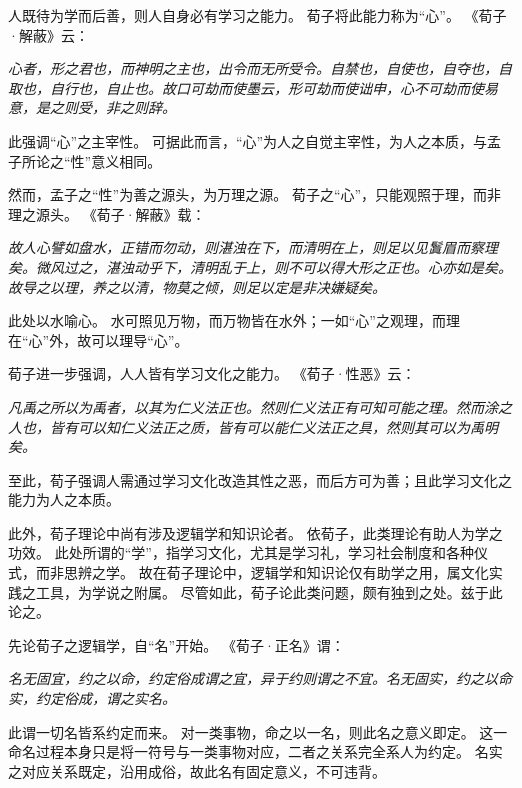 \documentclass[11pt]{article}
\begin{document}
\newline

人既待为学而后善，则人自身必有学习之能力。
荀子将此能力称为“心”。
《荀子·解蔽》云：

\textit{心者，形之君也，而神明之主也，出令而无所受令。自禁也，自使也，自夺也，自取也，自行也，自止也。故口可劫而使墨云，形可劫而使诎申，心不可劫而使易意，是之则受，非之则辞。}

此强调“心”之主宰性。
可据此而言，“心”为人之自觉主宰性，为人之本质，与孟子所论之“性”意义相同。

\newline

然而，孟子之“性”为善之源头，为万理之源。
荀子之“心”，只能观照于理，而非理之源头。
《荀子·解蔽》载：

\textit{故人心譬如盘水，正错而勿动，则湛浊在下，而清明在上，则足以见鬒眉而察理矣。微风过之，湛浊动乎下，清明乱于上，则不可以得大形之正也。心亦如是矣。故导之以理，养之以清，物莫之倾，则足以定是非决嫌疑矣。}

此处以水喻心。
水可照见万物，而万物皆在水外；一如“心”之观理，而理在“心”外，故可以理导“心”。

\newline

荀子进一步强调，人人皆有学习文化之能力。
《荀子·性恶》云：

\textit{凡禹之所以为禹者，以其为仁义法正也。然则仁义法正有可知可能之理。然而涂之人也，皆有可以知仁义法正之质，皆有可以能仁义法正之具，然则其可以为禹明矣。}

至此，荀子强调人需通过学习文化改造其性之恶，而后方可为善；且此学习文化之能力为人之本质。

\newline

此外，荀子理论中尚有涉及逻辑学和知识论者。
依荀子，此类理论有助人为学之功效。
此处所谓的“学”，指学习文化，尤其是学习礼，学习社会制度和各种仪式，而非思辨之学。
故在荀子理论中，逻辑学和知识论仅有助学之用，属文化实践之工具，为学说之附属。
尽管如此，荀子论此类问题，颇有独到之处。兹于此论之。

\newline

先论荀子之逻辑学，自“名”开始。
《荀子·正名》谓：

\textit{名无固宜，约之以命，约定俗成谓之宜，异于约则谓之不宜。名无固实，约之以命实，约定俗成，谓之实名。}

此谓一切名皆系约定而来。
对一类事物，命之以一名，则此名之意义即定。
这一命名过程本身只是将一符号与一类事物对应，二者之关系完全系人为约定。
名实之对应关系既定，沿用成俗，故此名有固定意义，不可违背。
\end{document}
